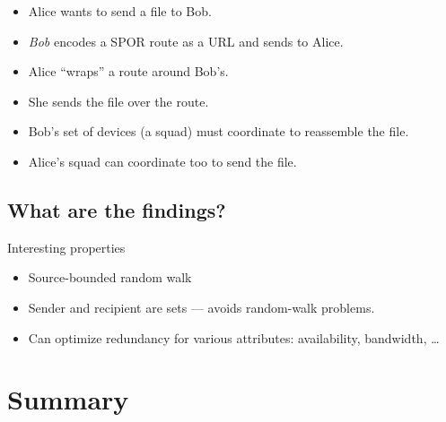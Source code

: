 \begin{frame}
  \begin{example}[Scenario]
    \begin{itemize}
      \item Alice wants to send a file to Bob.
      \item \emph{Bob} encodes a SPOR route as a URL and sends to Alice.
      \item Alice \enquote{wraps} a route around Bob's.
      \item She sends the file over the route.
    \end{itemize}
  \end{example}

  \pause

  \begin{remark}
    \begin{itemize}
      \item Bob's set of devices (a squad) must coordinate to reassemble the 
        file.
      \item Alice's squad can coordinate too to send the file.
    \end{itemize}
  \end{remark}
\end{frame}

\subsection{What are the findings?}

\begin{frame}
  \begin{block}{Interesting properties}
    \begin{itemize}
      \item Source-bounded random walk
      \item Sender and recipient are sets --- avoids random-walk problems.
      \item Can optimize redundancy for various attributes: availability, 
        bandwidth, \dots
    \end{itemize}
  \end{block}
\end{frame}


\section{Summary}

